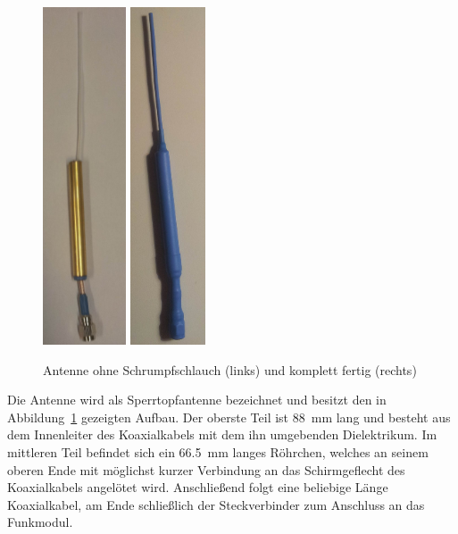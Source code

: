 \documentclass[paper=a4, parskip, numbers=noenddot, toc=listof, headsepline]{scrbook}
\begin{document}
			\begin{figure}
				\centering
				\includegraphics[height=10cm]{Bilder/Antenne}%
				\includegraphics[height=10cm]{Bilder/AntenneKomplett}
				\caption{Antenne ohne Schrumpfschlauch (links) und komplett fertig (rechts)}
				\label{fig:antenne}
			\end{figure}

			Die Antenne wird als Sperrtopfantenne bezeichnet und besitzt den in Abbildung~\ref{fig:antenne} gezeigten Aufbau. Der oberste Teil ist \SI{88}{\milli\metre} lang und besteht aus dem Innenleiter des Koaxialkabels mit dem ihn umgebenden Dielektrikum. Im mittleren Teil befindet sich ein \SI{66,5}{\milli\metre} langes Röhrchen, welches an seinem oberen Ende mit möglichst kurzer Verbindung an das Schirmgeflecht des Koaxialkabels angelötet wird. Anschließend folgt eine beliebige Länge Koaxialkabel, am Ende schließlich der Steckverbinder zum Anschluss an das Funkmodul.
\end{document}
